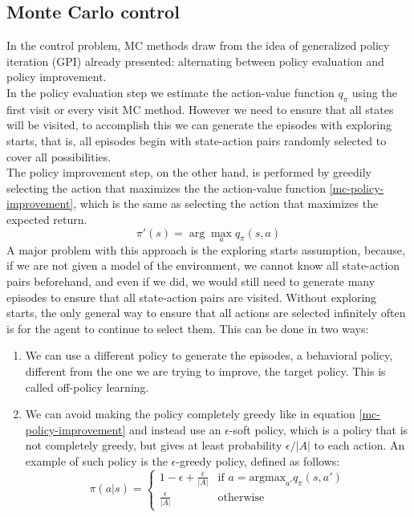 \subsection{Monte Carlo control}
In the control problem, MC methods draw from the idea of generalized policy iteration (GPI) already presented: alternating between policy evaluation and policy improvement.\\
In the policy evaluation step we estimate the action-value function $q_{\pi}$ using the first visit or every visit MC method. However we need to ensure that all states will be visited, to accomplish this we can generate the episodes with exploring starts, that is, all episodes begin with state-action pairs randomly selected to cover all possibilities.\\
The policy improvement step, on the other hand, is performed by greedily selecting the action that maximizes the the action-value function \eqref{mc-policy-improvement}, which is the same as selecting the action that maximizes the expected return.
\begin{equation}
    \pi'(s) = \arg \max_a q_{\pi}(s, a)
    \label{mc-policy-improvement}
\end{equation}
A major problem with this approach is the exploring starts assumption, because, if we are not given a model of the environment, we cannot know all state-action pairs beforehand, and even if we did, we would still need to generate many episodes to ensure that all state-action pairs are visited. Without exploring starts, the only general way to ensure that all actions are selected infinitely often is for the agent to continue to select them. This can be done in two ways:
\begin{enumerate}
    \item We can use a different policy to generate the episodes, a behavioral policy, different from the one we are trying to improve, the target policy. This is called off-policy learning.
    \item We can avoid making the policy completely greedy like in equation \eqref{mc-policy-improvement} and instead use an $\epsilon$-soft policy, which is a policy that is not completely greedy, but gives at least probability $\epsilon / |A|$ to each action. An example of such policy is the $\epsilon$-greedy policy, defined as follows:
    \begin{equation}
        \pi(a|s) = \begin{cases}
            1 - \epsilon + \frac{\epsilon}{|A|} & \text{if } a = \mathrm{argmax}_{a'} q_{\pi}(s, a') \\
            \frac{\epsilon}{|A|} & \text{otherwise}
        \end{cases}
        \label{epsilon-greedy-policy}
    \end{equation}
\end{enumerate}

